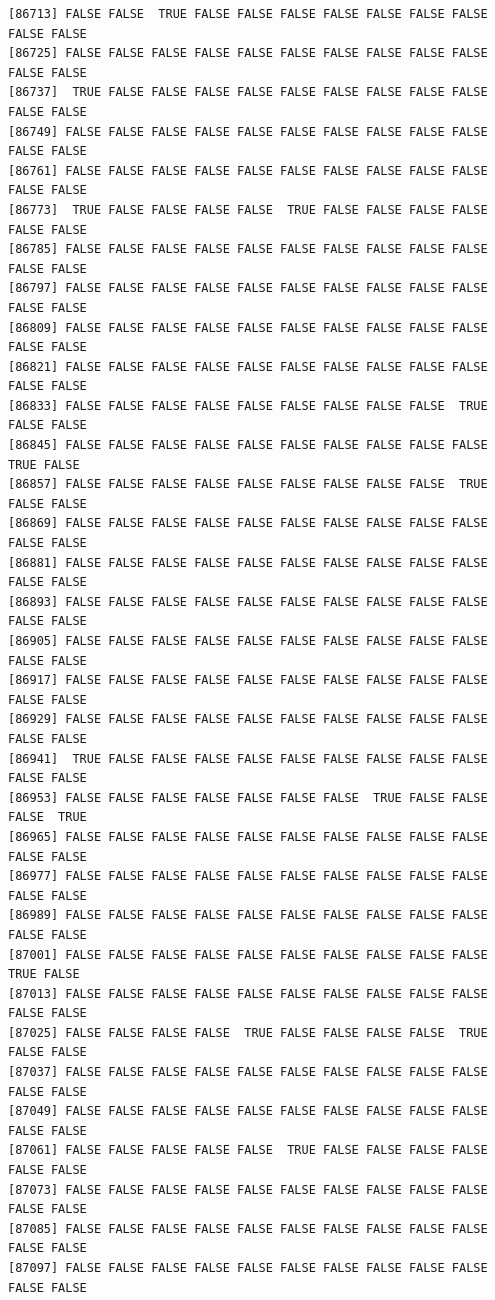\documentclass[
  a4paper,
  DIV=11,
  numbers=noendperiod]{scrartcl}
\begin{document}
\begin{verbatim}
[86713] FALSE FALSE  TRUE FALSE FALSE FALSE FALSE FALSE FALSE FALSE FALSE FALSE
[86725] FALSE FALSE FALSE FALSE FALSE FALSE FALSE FALSE FALSE FALSE FALSE FALSE
[86737]  TRUE FALSE FALSE FALSE FALSE FALSE FALSE FALSE FALSE FALSE FALSE FALSE
[86749] FALSE FALSE FALSE FALSE FALSE FALSE FALSE FALSE FALSE FALSE FALSE FALSE
[86761] FALSE FALSE FALSE FALSE FALSE FALSE FALSE FALSE FALSE FALSE FALSE FALSE
[86773]  TRUE FALSE FALSE FALSE FALSE  TRUE FALSE FALSE FALSE FALSE FALSE FALSE
[86785] FALSE FALSE FALSE FALSE FALSE FALSE FALSE FALSE FALSE FALSE FALSE FALSE
[86797] FALSE FALSE FALSE FALSE FALSE FALSE FALSE FALSE FALSE FALSE FALSE FALSE
[86809] FALSE FALSE FALSE FALSE FALSE FALSE FALSE FALSE FALSE FALSE FALSE FALSE
[86821] FALSE FALSE FALSE FALSE FALSE FALSE FALSE FALSE FALSE FALSE FALSE FALSE
[86833] FALSE FALSE FALSE FALSE FALSE FALSE FALSE FALSE FALSE  TRUE FALSE FALSE
[86845] FALSE FALSE FALSE FALSE FALSE FALSE FALSE FALSE FALSE FALSE  TRUE FALSE
[86857] FALSE FALSE FALSE FALSE FALSE FALSE FALSE FALSE FALSE  TRUE FALSE FALSE
[86869] FALSE FALSE FALSE FALSE FALSE FALSE FALSE FALSE FALSE FALSE FALSE FALSE
[86881] FALSE FALSE FALSE FALSE FALSE FALSE FALSE FALSE FALSE FALSE FALSE FALSE
[86893] FALSE FALSE FALSE FALSE FALSE FALSE FALSE FALSE FALSE FALSE FALSE FALSE
[86905] FALSE FALSE FALSE FALSE FALSE FALSE FALSE FALSE FALSE FALSE FALSE FALSE
[86917] FALSE FALSE FALSE FALSE FALSE FALSE FALSE FALSE FALSE FALSE FALSE FALSE
[86929] FALSE FALSE FALSE FALSE FALSE FALSE FALSE FALSE FALSE FALSE FALSE FALSE
[86941]  TRUE FALSE FALSE FALSE FALSE FALSE FALSE FALSE FALSE FALSE FALSE FALSE
[86953] FALSE FALSE FALSE FALSE FALSE FALSE FALSE  TRUE FALSE FALSE FALSE  TRUE
[86965] FALSE FALSE FALSE FALSE FALSE FALSE FALSE FALSE FALSE FALSE FALSE FALSE
[86977] FALSE FALSE FALSE FALSE FALSE FALSE FALSE FALSE FALSE FALSE FALSE FALSE
[86989] FALSE FALSE FALSE FALSE FALSE FALSE FALSE FALSE FALSE FALSE FALSE FALSE
[87001] FALSE FALSE FALSE FALSE FALSE FALSE FALSE FALSE FALSE FALSE  TRUE FALSE
[87013] FALSE FALSE FALSE FALSE FALSE FALSE FALSE FALSE FALSE FALSE FALSE FALSE
[87025] FALSE FALSE FALSE FALSE  TRUE FALSE FALSE FALSE FALSE  TRUE FALSE FALSE
[87037] FALSE FALSE FALSE FALSE FALSE FALSE FALSE FALSE FALSE FALSE FALSE FALSE
[87049] FALSE FALSE FALSE FALSE FALSE FALSE FALSE FALSE FALSE FALSE FALSE FALSE
[87061] FALSE FALSE FALSE FALSE FALSE  TRUE FALSE FALSE FALSE FALSE FALSE FALSE
[87073] FALSE FALSE FALSE FALSE FALSE FALSE FALSE FALSE FALSE FALSE FALSE FALSE
[87085] FALSE FALSE FALSE FALSE FALSE FALSE FALSE FALSE FALSE FALSE FALSE FALSE
[87097] FALSE FALSE FALSE FALSE FALSE FALSE FALSE FALSE FALSE FALSE FALSE FALSE

\end{verbatim}
\end{document}
